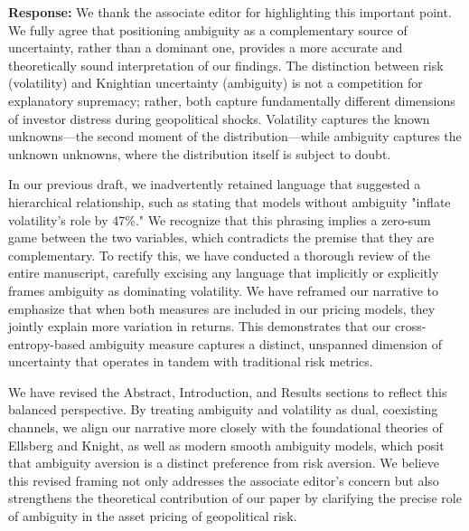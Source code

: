 \documentclass[12pt]{article}
\begin{document}
\begin{highlightbox}
\textbf{Response:} We thank the associate editor for highlighting this important point. We fully agree that positioning ambiguity as a complementary source of uncertainty, rather than a dominant one, provides a more accurate and theoretically sound interpretation of our findings. The distinction between risk (volatility) and Knightian uncertainty (ambiguity) is not a competition for explanatory supremacy; rather, both capture fundamentally different dimensions of investor distress during geopolitical shocks. Volatility captures the known unknowns---the second moment of the distribution---while ambiguity captures the unknown unknowns, where the distribution itself is subject to doubt. 

In our previous draft, we inadvertently retained language that suggested a hierarchical relationship, such as stating that models without ambiguity "inflate volatility's role by 47\%." We recognize that this phrasing implies a zero-sum game between the two variables, which contradicts the premise that they are complementary. To rectify this, we have conducted a thorough review of the entire manuscript, carefully excising any language that implicitly or explicitly frames ambiguity as dominating volatility. We have reframed our narrative to emphasize that when both measures are included in our pricing models, they jointly explain more variation in returns. This demonstrates that our cross-entropy-based ambiguity measure captures a distinct, unspanned dimension of uncertainty that operates in tandem with traditional risk metrics.

We have revised the Abstract, Introduction, and Results sections to reflect this balanced perspective. By treating ambiguity and volatility as dual, coexisting channels, we align our narrative more closely with the foundational theories of Ellsberg and Knight, as well as modern smooth ambiguity models, which posit that ambiguity aversion is a distinct preference from risk aversion. We believe this revised framing not only addresses the associate editor's concern but also strengthens the theoretical contribution of our paper by clarifying the precise role of ambiguity in the asset pricing of geopolitical risk.
\end{highlightbox}
\end{document}
